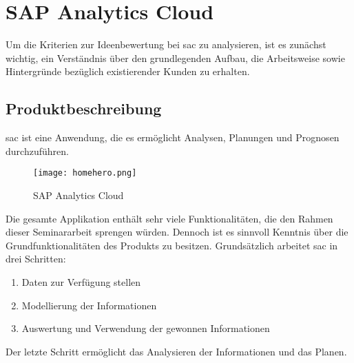 \newpage
\section{SAP Analytics Cloud}\label{sec:sac}
Um die Kriterien zur Ideenbewertung bei \ac{sac} zu analysieren, ist es zunächst 
wichtig, ein Verständnis über den grundlegenden Aufbau, die Arbeitsweise sowie Hintergründe bezüglich 
existierender Kunden zu erhalten. 

\subsection{Produktbeschreibung}
\ac{sac} ist eine Anwendung, die es ermöglicht Analysen, Planungen und Prognosen durchzuführen. 
\begin{figure}[!h]
	\centering 
	\texttt{[image: homehero.png]}
	\caption{SAP Analytics Cloud}
	\label{img:homeHeroSAC}
\end{figure}
Die gesamte Applikation enthält sehr viele Funktionalitäten, die den Rahmen dieser Seminararbeit sprengen würden. Dennoch ist
es sinnvoll Kenntnis über die Grundfunktionalitäten des Produkts zu besitzen. 
Grundsätzlich arbeitet \ac{sac} in drei Schritten:

\begin{enumerate}
    \item Daten zur Verfügung stellen
    \item Modellierung der Informationen
    \item Auswertung und Verwendung der gewonnen Informationen 
\end{enumerate}
Der letzte Schritt ermöglicht das Analysieren der Informationen und das Planen. 

